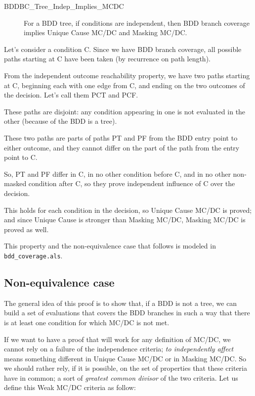 \documentclass[a4paper,12pt,twoside]{article}
\newcommand{\alloyspec}[1]{\texttt{#1}}
\begin{document}
\begin{description}
\item[BDDBC\_Tree\_Indep\_Implies\_MCDC]
  For a BDD tree, if conditions are independent, then
  BDD branch coverage implies Unique Cause MC/DC and Masking MC/DC.
\end{description}

Let's consider a condition C. Since we have BDD branch coverage,
all possible paths starting at C have been taken (by recurrence on path
length).

From the independent outcome reachability property, we have two paths
starting at C, beginning each with one edge from C, and ending on the
two outcomes of the decision. Let's call them PCT and PCF.

These paths are disjoint: any condition appearing in one is not evaluated
in the other (because of the BDD is a tree).

These two paths are parts of paths PT and PF from the BDD entry point to
either outcome, and they cannot differ on the part of the path from the
entry point to C.

So, PT and PF differ in C, in no other condition before C, and in no
other non-masked condition after C, so they prove independent influence
of C over the decision.

This holds for each condition in the decision, so Unique Cause MC/DC
is proved; and since Unique Cause is stronger than Masking MC/DC,
Masking MC/DC is proved as well.

This property and the non-equivalence case that follows is modeled
in \alloyspec{bdd\_coverage.als}.

\subsection{Non-equivalence case}

The general idea of this proof is to show that, if a BDD is not a
tree, we can build a set of evaluations that covers the BDD branches
in such a way that there is at least one condition for which MC/DC is
not met.

If we want to have a proof that will work for any definition of MC/DC,
we cannot rely on a failure of the independence criteria; \textit{to
independently affect} means something different in Unique Cause MC/DC
or in Masking MC/DC. So we should rather rely, if it is possible, on
the set of properties that these criteria have in common; a sort of
\textit{greatest common divisor} of the two criteria. Let us define
this Weak MC/DC criteria as follow:
\end{document}
